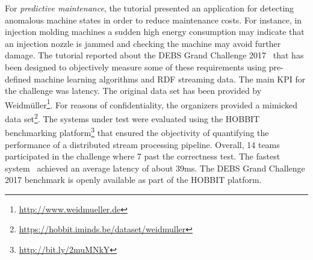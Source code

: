 For \emph{predictive maintenance}, the tutorial presented an application for detecting anomalous machine states in order to reduce maintenance costs. For instance, in injection molding machines a sudden high energy consumption may indicate that an injection nozzle is jammed and checking the machine may avoid further damage. The tutorial reported about the DEBS Grand Challenge 2017~\cite{gulisano_et_al_2017} that has been designed to objectively measure some of these requirements using pre-defined machine learning algorithms and RDF streaming data. The main KPI for the challenge was latency. The original data set has been provided by \textsf{Weidmüller}\footnote{\url{http://www.weidmueller.de}}. For reasons of confidentiality, the organizers provided a mimicked data set\footnote{\url{https://hobbit.iminds.be/dataset/weidmuller}}. The systems under test were evaluated using the \textsf{HOBBIT} benchmarking platform\footnote{\url{http://bit.ly/2muMNkY}} that ensured the objectivity of quantifying the performance of a distributed stream processing pipeline. Overall, 14 teams participated in the challenge where 7 past the correctness test. The fastest system~\cite{amariei_et_al_2017} achieved an average latency of about 39ms. The DEBS Grand Challenge 2017 benchmark is openly available as part of the HOBBIT platform.







